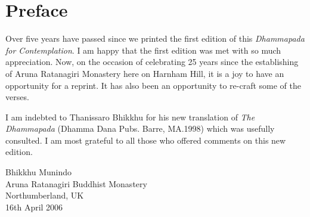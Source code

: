 
\chapter[Preface to the second edition (2006)]{Preface}

Over five years have passed since we printed the first edition of this \emph{Dhammapada for Contemplation}. I am happy that the first edition was met with so much appreciation. Now, on the occasion of celebrating 25 years since the establishing of Aruna Ratanagiri Monastery here on Harnham Hill, it is a joy to have an opportunity for a reprint. It has also been an opportunity to re-craft some of  the verses.

I am indebted to Thanissaro Bhikkhu for his new translation of \emph{The Dhammapada} (Dhamma Dana Pubs. Barre, MA.1998) which was usefully consulted. I am most grateful to all those who offered comments on this new edition.

\bigskip

{\raggedleft
Bhikkhu Munindo\\
Aruna Ratanagiri Buddhist Monastery\\
Northumberland, UK\\
16th April 2006
\par}

